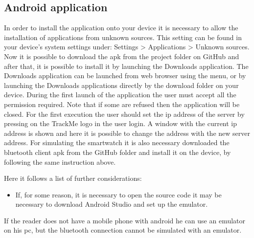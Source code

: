\subsection{Android application}
In order to install the application onto your device it is necessary to allow the installation of applications from unknown sources. This setting can be found in your device's system settings under: Settings > Applications > Unknown sources. 
\\
Now it is possible to download the apk from the project folder on GitHub and after that, it is possible to install it by launching the Downloads application. The Downloads application can be launched from web browser using the menu, or by launching the Downloads applications directly by the download folder on your device. During the first launch of the application the user must accept all the permission required. Note that if some are refused then the application will be closed. For the first execution the user should set the ip address of the server by pressing on the TrackMe logo in the user login. A window with the current ip address is shown and here it is possible to change the address with the new server address. For simulating the smartwatch it is also necessary downloaded the bluetooth client apk from the GitHub folder and install it on the device, by following the same instruction above.

\par 
Here it follows a list of further considerations: 
\begin{itemize}
\item If, for some reason, it is necessary to open the source code it may be necessary to download Android Studio and set up the emulator. \\
\end{itemize}

\par
If the reader does not have a mobile phone with android he can use an emulator on his pc, but the bluetooth connection cannot be simulated with an emulator.


